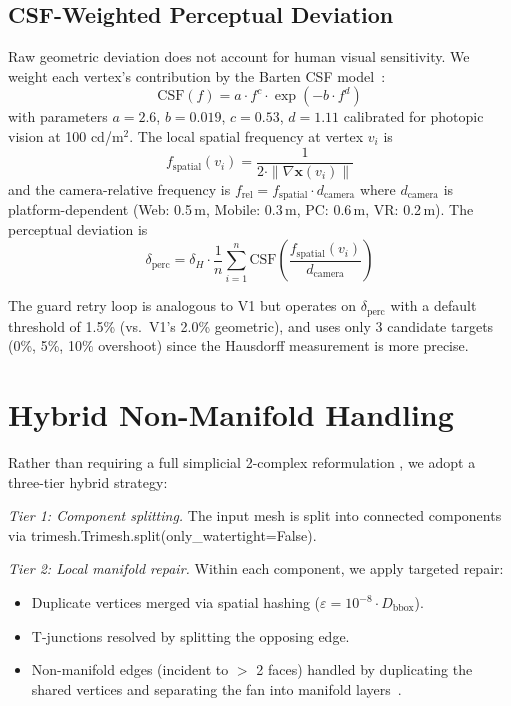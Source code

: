 \documentclass[10pt, twocolumn, a4paper]{article}
\newcommand{\vect}[1]{\bm{#1}}
\begin{document}
\subsection{CSF-Weighted Perceptual Deviation}
Raw geometric deviation does not account for human visual
sensitivity. We weight each vertex's contribution by the Barten CSF
model~\cite{barten1999contrast}:
\begin{equation}
  \label{eq:csf}
  \text{CSF}(f) = a \cdot f^c \cdot \exp(-b \cdot f^d)
\end{equation}
with parameters $a = 2.6$, $b = 0.019$, $c = 0.53$, $d = 1.11$
calibrated for photopic vision at 100 cd/m$^2$. The local spatial
frequency at vertex $v_i$ is
\begin{equation}
  \label{eq:freq}
  f_{\text{spatial}}(v_i) = \frac{1}{2 \cdot \|\nabla \vect{x}(v_i)\|}
\end{equation}
and the camera-relative frequency is $f_{\text{rel}} =
f_{\text{spatial}} \cdot d_{\text{camera}}$ where $d_{\text{camera}}$
is platform-dependent (Web: 0.5\,m, Mobile: 0.3\,m, PC: 0.6\,m,
VR: 0.2\,m). The perceptual deviation is
\begin{equation}
  \label{eq:perc_dev}
  \delta_{\text{perc}} = \delta_H \cdot
  \frac{1}{n} \sum_{i=1}^n
  \text{CSF}\!\left(\frac{f_{\text{spatial}}(v_i)}{d_{\text{camera}}}\right)
\end{equation}

The guard retry loop is analogous to V1 but operates on
$\delta_{\text{perc}}$ with a default threshold of 1.5\% (vs.\
V1's 2.0\% geometric), and uses only 3 candidate targets (0\%, 5\%,
10\% overshoot) since the Hausdorff measurement is more precise.

\section{Hybrid Non-Manifold Handling}
\label{sec:nonmanifold}

Rather than requiring a full simplicial 2-complex reformulation
\cite{liu2025simplifying}, we adopt a three-tier hybrid strategy:

\noindent\textit{Tier 1: Component splitting.}
The input mesh is split into connected components via
trimesh.Trimesh.split(only\_watertight=False).

\noindent\textit{Tier 2: Local manifold repair.}
Within each component, we apply targeted repair:
\begin{itemize}
  \item Duplicate vertices merged via spatial hashing
  ($\varepsilon = 10^{-8} \cdot D_{\text{bbox}}$).
  \item T-junctions resolved by splitting the opposing edge.
  \item Non-manifold edges (incident to $>$ 2 faces) handled by
  duplicating the shared vertices and separating the fan into
  manifold layers~\cite{guibas1998epsilon}.
\end{itemize}
\end{document}
